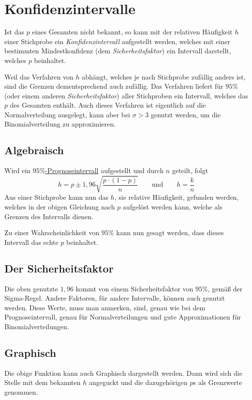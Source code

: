 \documentclass{article}
\begin{document}
\section{Konfidenzintervalle}
Ist das $p$ eines Gesamten nicht bekannt, so kann mit der relativen Häufigkeit $h$ einer Stichprobe ein \emph{Konfidenzintervall} aufgestellt werden, welches mit einer bestimmten Mindestkonfidenz (dem \emph{Sicherheitsfaktor}) ein Intervall darstellt, welches $p$ beinhaltet.
 
Weil das Verfahren von $h$ abhängt, welches je nach Stichprobe zufällig anders ist, sind die Grenzen dementsprechend auch zufällig. Das Verfahren liefert für $95\%$ (oder einem anderen \emph{Sicherheitsfaktor}) aller Stichproben ein Intervall, welches das $p$ des Gesamten enthält. Auch dieses Verfahren ist eigentlich auf die Normalverteilung ausgelegt, kann aber bei $\sigma > 3$ genutzt werden, um die Binomialverteilung zu approximieren.
 
\subsection{Algebraisch}
Wird ein \hyperref[Prognosen]{$95\%$-Prognoseintervall} aufgestellt und durch $n$ geteilt, folgt 
\[
 h = p \pm 1,96 \sqrt{\frac{p \cdot (1-p)}{n}}
 \qquad \text{und} \qquad
 h = \frac{k}{n} 
\]
Aus einer Stichprobe kann nun das $h$, sie relative Häufigkeit, gefunden werden, welches in der obigen Gleichung nach $p$ aufgelöst werden kann, welche als Grenzen des Intervalls dienen.
 
Zu einer Wahrscheinlichkeit von $95\%$ kann nun gesagt werden, dass dieses Intervall das echte $p$ beinhaltet. 
 
\subsection{Der Sicherheitsfaktor} 
Die oben genutzte $1,96$ kommt von einem Sicherheitsfaktor von $95\%$, gemäß der Sigma-Regel. Andere Faktoren, für andere Intervalle, können auch genutzt werden. Diese Werte, muss man anmerken, sind, genau wie bei dem Prognoseintervall, genau für Normalverteilungen und gute Approximationen für Binomialverteilungen.
 
\subsection{Graphisch}
Die obige Funktion kann auch Graphisch dargestellt werden. Dann wird sich die Stelle mit dem bekannten $h$ angeguckt und die dazugehörigen $p$s als Grenzwerte genommen.
 
\end{document}
